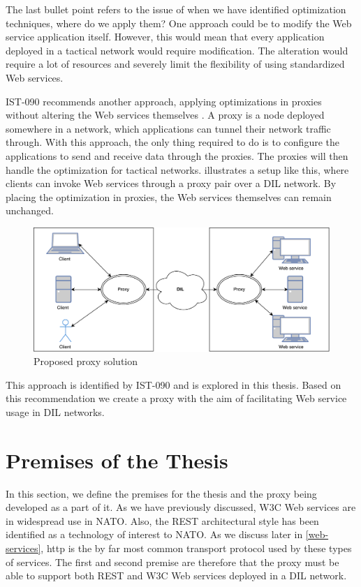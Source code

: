 The last bullet point refers to the issue of when we have identified
optimization techniques, where do we apply them? One approach could be to modify
the Web service application itself. However, this would mean that every
application deployed in a tactical network would require modification. The
alteration would require a lot of resources and severely limit the flexibility
of using standardized Web services.

IST-090 recommends another approach, applying optimizations in proxies without
altering the Web services themselves \cite{ist-090}. A proxy is a node deployed
somewhere in a network, which applications can tunnel their network traffic
through. With this approach, the only thing required to do is to configure the
applications to send and receive data through the proxies. The proxies will then
handle the optimization for tactical networks.
 illustrates a setup like this, where
clients can invoke Web services through a proxy pair over a DIL network. By
placing the optimization in proxies, the Web services themselves can remain
unchanged.

\begin{figure}[h] \includegraphics[width=\textwidth]{images/proposed_solution.pdf}
\caption{Proposed proxy solution} \label{figure-proposed-proxy-solution}
\end{figure}

This approach is identified by IST-090 and is explored in this thesis. Based on
this recommendation we create a proxy with the aim of facilitating Web service
usage in DIL networks.


\section{Premises of the Thesis}

In this section, we define the premises for the thesis and the proxy being
developed as a part of it. As we have previously discussed, W3C Web services are
in widespread use in NATO. Also, the REST architectural style has been identified
as a technology of interest to NATO. As we discuss later in \cref{web-services},
\gls{http} is the by far most common transport protocol used by these types of
services. The first and second premise are therefore that the proxy must be able
to support both REST and W3C Web services deployed in a DIL network.

